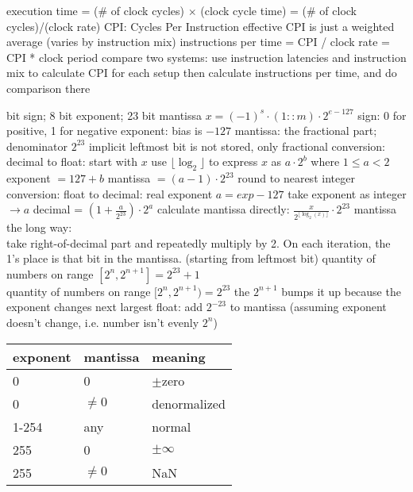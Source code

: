 \documentclass[12pt]{article}
\begin{document}
\begin{spacing}{0.9}
\begin{multicols*}{2}
\begin{flushleft}
\begin{outline}[longenum]
  \1 execution time = (\# of clock cycles) $\times$ (clock cycle time)
    = (\# of clock cycles)/(clock rate) 
  \1 CPI: Cycles Per Instruction
    \2 effective CPI is just a weighted average (varies by instruction mix)
  \1 instructions per time = CPI / clock rate = CPI * clock period
  \1 compare two systems:
    \2 use instruction latencies and instruction mix to calculate CPI for each setup
    \2 then calculate instructions per time, and do comparison there 

   bit sign; 8 bit exponent; 23 bit mantissa
    \2 $x = (-1)^s \cdot (1::m) \cdot 2^{e-127}$
  \1 sign: 0 for positive, 1 for negative
  \1 exponent: bias is $-127$
  \1 mantissa: the fractional part; denominator $2^{23}$
    \2 implicit leftmost bit is not stored, only fractional
  \1 conversion: decimal to float:
    \2 start with $x$
    \2 use $\lfloor \log_2 \rfloor$ to express $x$ as $a \cdot 2^b$ where $1\leq a < 2$
    \2 exponent $=127+b$
    \2 mantissa $=(a-1) \cdot 2^{23}$
      \3 round to nearest integer
  \1 conversion: float to decimal:
    \2 real exponent $a = exp-127$
    \2 take exponent as integer $\rightarrow a$
    \2 decimal = $(1 + \frac{a}{2^{23}}) \cdot 2^a$
  \1 calculate mantissa directly: $\frac{x}{2^{\lfloor \log_2(x) \rfloor}} \cdot 2^{23}$
  \1 mantissa the long way:
    \\ take right-of-decimal part and repeatedly multiply by 2. On each iteration, the 1's place is that bit in the mantissa. (starting from leftmost bit)
  \1 quantity of numbers on range $[2^n, 2^{n+1}] = 2^{23} + 1$
    \\ quantity of numbers on range $[2^n, 2^{n+1}) = 2^{23}$
    \2 the $2^{n+1}$ bumps it up because the exponent changes
  \1 next largest float: add $2^{-23}$ to mantissa (assuming exponent doesn't change, i.e. number isn't evenly $2^n$)
  \1 
  \begin{tabular}{|l l l|} \hline
    exponent & mantissa & meaning     \\ \hline
    0        & 0        & $\pm$zero        \\ \hline
    0        & $\not=0$ & denormalized \\ \hline
    1-254    & any      & normal      \\ \hline
    255      & 0        & $\pm\infty$ \\ \hline
    255      & $\not=0$ & NaN         \\ \hline
  \end{tabular}
  \1 
  \begin{tabular}{|l l l|} \hline

\end{tabular}
\end{outline}
\end{flushleft}
\end{multicols*}
\end{spacing}
\end{document}
